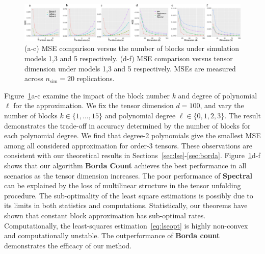 \documentclass{article}
\theoremstyle{definition}
\begin{document}

\vspace{-.3cm}
\begin{figure}[htp]
    \centering
    \includegraphics[width =\textwidth]{figures/sim2.pdf}    
    \caption{(a-c) MSE comparison versus the number of blocks under simulation models 1,3 and 5 respectively. (d-f) MSE comparison versus tensor dimension under models 1,3 and 5 respectively. MSEs are measured across $n_{\text{sim}} = 20$ replications.}
    \label{fig:degk}
    \vspace{-.3cm}
\end{figure}

Figure~\ref{fig:degk}a-c examine the impact of the block number $k$ and degree of polynomial $\ell$ for the approximation. We fix the tensor dimension $d = 100$, and vary the number of blocks $k\in\{1,\ldots,15\}$ and polynomial degree $\ell\in\{0,1,2,3\}.$ The result demonstrates the trade-off in accuracy determined by the number of blocks for each polynomial degree. We find that degree-2 polynomials give the smallest MSE among all considered approximation for order-3 tensors. These observations are consistent with our theoretical results in Sections~\ref{sec:lse}-\ref{sec:borda}. Figure~\ref{fig:degk}d-f shows that our algorithm {\bf \small Borda Count} achieves the best performance in all scenarios as the tensor dimension increases. The poor performance of {\bf \small Spectral} can be explained by the loss of multilinear structure in the tensor unfolding procedure. The sub-optimality of the least square estimations is possibly due to its limits in both statistics and computations. Statistically, our theorems have shown that constant block approximation has sub-optimal rates. Computationally, the least-squares estimation~\eqref{eq:lseopt} is highly non-convex and computationally unstable. The outperformance of {\bf \small Borda count} demonstrates the efficacy of our method.
\end{document}
